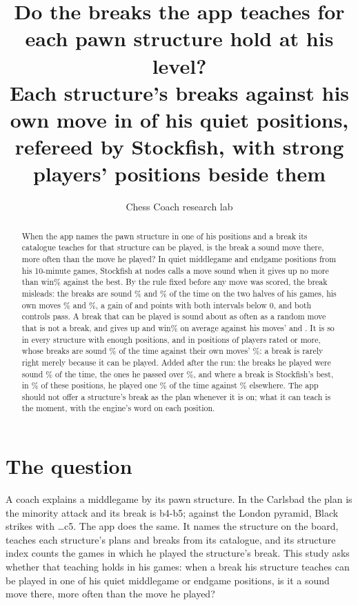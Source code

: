 \documentclass[11pt]{article}
\title{Do the breaks the app teaches for each pawn structure hold at his level?\\[0.3em]
\large Each structure's breaks against his own move in \ScoredAll{} of his quiet positions,
refereed by Stockfish, with strong players' positions beside them}
\author{Chess Coach research lab}
\date{}
\begin{document}
\maketitle

\begin{abstract}
When the app names the pawn structure in one of his positions and a break its catalogue teaches
for that structure can be played, is the break a sound move there, more often than the move he
played? In \ScoredAll{} quiet middlegame and endgame positions from his 10-minute games, Stockfish
at \GradeNodes{} nodes calls a move sound when it gives up no more than \Window{} win\% against
the best. By the rule fixed before any move was scored, the break misleads: the breaks are sound
\BFirst\% and \BSecond\% of the time on the two halves of his games, his own moves \AFirst\% and
\ASecond\%, a gain of \GainFirst{} and \GainSecond{} points with both intervals below 0, and both
controls pass. A break that can be played is sound about as often as a random move that is not a
break, and gives up \LostBFirst{} and \LostBSecond{} win\% on average against his moves'
\LostAFirst{} and \LostASecond. It is so in every structure with enough positions, and in
\StrongScored{} positions of players rated \Floor{} or more, whose breaks are sound \StrongB\% of
the time against their own moves' \StrongS\%: a break is rarely right merely because it can be
played. Added after the run: the breaks he played were sound \PlayedSound\% of the time, the ones
he passed over \NotPlayedB\%, and where a break is Stockfish's best, in \BestShare\% of these
positions, he played one \BestPlayed\% of the time against \NotBestPlayed\% elsewhere. The app
should not offer a structure's break as the plan whenever it is on; what it can teach is the
moment, with the engine's word on each position.
\end{abstract}

\section{The question}

A coach explains a middlegame by its pawn structure. In the Carlsbad the plan is the minority
attack and its break is b4-b5; against the London pyramid, Black strikes with \ldots c5. The app
does the same. It names the structure on the board, teaches each structure's plans and breaks
from its catalogue, and its structure index counts the games in which he played the structure's
break. This study asks whether that teaching holds in his games: when a break his structure
teaches can be played in one of his quiet middlegame or endgame positions, is it a sound move
there, more often than the move he played?
\end{document}
